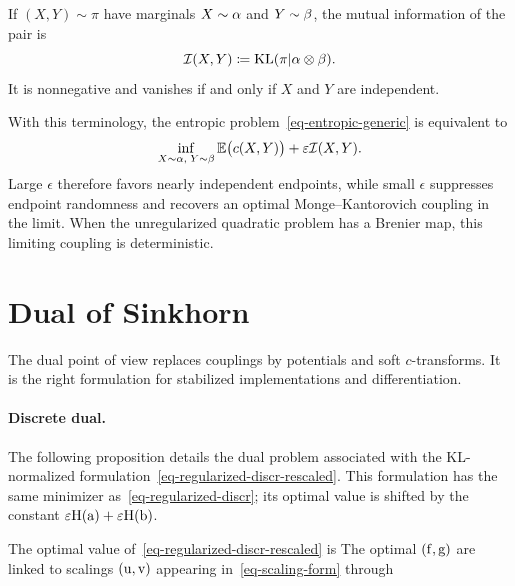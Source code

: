 \begin{defn}\label{def-mutual-information}
	If $(X,Y)\sim\pi$ have marginals $X\sim\alpha$ and $Y\sim\beta$, the mutual information of the pair is
	\[
		\mathcal{I}(X,Y)\coloneqq \operatorname{KL}(\pi|\alpha\otimes\beta).
	\]
	It is nonnegative and vanishes if and only if $X$ and $Y$ are independent.
\end{defn}
With this terminology, the entropic problem~\eqref{eq-entropic-generic} is equivalent to
\[
	\inf_{X\sim\alpha,\;Y\sim\beta}
	\mathbb{E}\bigl(c(X,Y)\bigr)+\varepsilon\mathcal{I}(X,Y).
\]
Large $\epsilon$ therefore favors nearly independent endpoints, while small $\epsilon$ suppresses endpoint randomness and recovers an optimal Monge--Kantorovich coupling in the limit. When the unregularized quadratic problem has a Brenier map, this limiting coupling is deterministic.



\section{Dual of Sinkhorn}

The dual point of view replaces couplings by potentials and soft $c$-transforms. It is the right formulation for stabilized implementations and differentiation.

\paragraph{Discrete dual.}

The following proposition details the dual problem associated with the KL-normalized formulation~\eqref{eq-regularized-discr-rescaled}. This formulation has the same minimizer as~\eqref{eq-regularized-discr}; its optimal value is shifted by the constant $\varepsilon\mathrm{H}(\mathrm{a})+\varepsilon\mathrm{H}(\mathrm{b})$.

\begin{prop}
The optimal value of~\eqref{eq-regularized-discr-rescaled} is
%
The optimal $(\mathrm{f},\mathrm{g})$ are linked to scalings $(\mathrm{u},\mathrm{v})$ appearing in~\eqref{eq-scaling-form} through
\end{prop}

